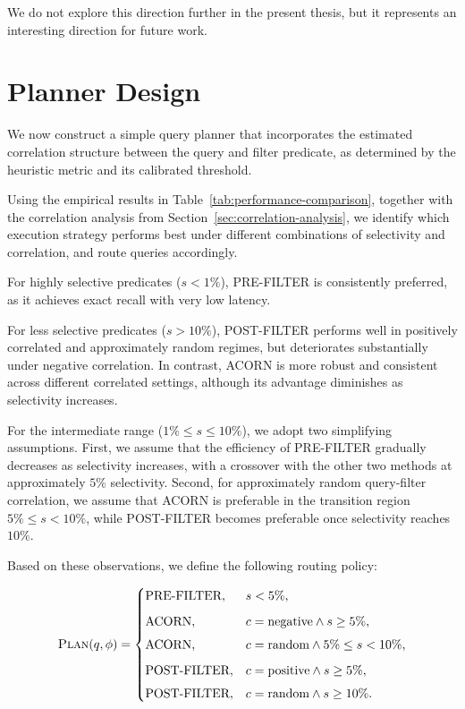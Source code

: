 We do not explore this direction further in the present thesis, but it represents an interesting direction for future work.


\section{Planner Design}

We now construct a simple query planner that incorporates the estimated
correlation structure between the query and filter predicate, as determined by
the heuristic metric and its calibrated threshold.

Using the empirical results in Table~\ref{tab:performance-comparison}, together
with the correlation analysis from Section~\ref{sec:correlation-analysis}, we
identify which execution strategy performs best under different combinations of
selectivity and correlation, and route queries accordingly.

For highly selective predicates (\(s < 1\%\)), PRE-FILTER is consistently
preferred, as it achieves exact recall with very low latency.

For less selective predicates (\(s > 10\%\)), POST-FILTER performs well in
positively correlated and approximately random regimes, but deteriorates
substantially under negative correlation. In contrast, ACORN is more robust and
consistent across different correlated settings, although its advantage
diminishes as selectivity increases.

For the intermediate range (\(1\% \leq s \leq 10\%\)), we adopt two simplifying
assumptions. First, we assume that the efficiency of PRE-FILTER gradually
decreases as selectivity increases, with a crossover with the other two methods
at approximately \(5\%\) selectivity. Second, for approximately random
query-filter correlation, we assume that ACORN is preferable in the transition
region \(5\% \le s < 10\%\), while POST-FILTER becomes preferable once
selectivity reaches \(10\%\).

Based on these observations, we define the following routing policy:

\[
\textsc{Plan}(q,\phi)=
\begin{cases}
\text{PRE-FILTER},
& s < 5\%, \\[6pt]

\text{ACORN},
& c=\text{negative} \land s \ge 5\%, \\[4pt]

\text{ACORN},
& c=\text{random} \land 5\% \le s < 10\%, \\[6pt]

\text{POST-FILTER},
& c=\text{positive} \land s \ge 5\%, \\[4pt]

\text{POST-FILTER},
& c=\text{random} \land s \ge 10\%.
\end{cases}
\]

